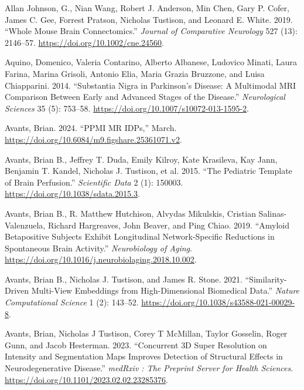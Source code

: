 \documentclass[
  table]{article}
\newlength{\cslhangindent}
\newenvironment{CSLReferences}[2] %
 {\begin{list}{}{%
  \setlength{\itemindent}{0pt}
  \setlength{\leftmargin}{0pt}
  \setlength{\parsep}{0pt}
  \ifodd #1
   \setlength{\leftmargin}{\cslhangindent}
   \setlength{\itemindent}{-1\cslhangindent}
  \fi
  \setlength{\itemsep}{#2\baselineskip}}}
 {\end{list}}
\begin{document}
\label{refs}
\begin{CSLReferences}{1}{0}
Allan Johnson, G., Nian Wang, Robert J. Anderson, Min Chen, Gary P.
Cofer, James C. Gee, Forrest Pratson, Nicholas Tustison, and Leonard E.
White. 2019. {``Whole Mouse Brain Connectomics.''} \emph{Journal of
Comparative Neurology} 527 (13): 2146--57.
\url{https://doi.org/10.1002/cne.24560}.

Aquino, Domenico, Valeria Contarino, Alberto Albanese, Ludovico Minati,
Laura Farina, Marina Grisoli, Antonio Elia, Maria Grazia Bruzzone, and
Luisa Chiapparini. 2014. {``Substantia Nigra in {Parkinson}{'}s Disease:
A Multimodal {MRI} Comparison Between Early and Advanced Stages of the
Disease.''} \emph{Neurological Sciences} 35 (5): 753--58.
\url{https://doi.org/10.1007/s10072-013-1595-2}.

Avants, Brian. 2024. {``{PPMI} {MR} {IDPs},''} March.
\url{https://doi.org/10.6084/m9.figshare.25361071.v2}.

Avants, Brian B., Jeffrey T. Duda, Emily Kilroy, Kate Krasileva, Kay
Jann, Benjamin T. Kandel, Nicholas J. Tustison, et al. 2015. {``The
Pediatric Template of Brain Perfusion.''} \emph{Scientific Data} 2 (1):
150003. \url{https://doi.org/10.1038/sdata.2015.3}.

Avants, Brian B., R. Matthew Hutchison, Alvydas Mikulskis, Cristian
Salinas-Valenzuela, Richard Hargreaves, John Beaver, and Ping Chiao.
2019. {``Amyloid Beta{\textendash}positive Subjects Exhibit Longitudinal
Network-Specific Reductions in Spontaneous Brain Activity.''}
\emph{Neurobiology of Aging}.
\url{https://doi.org/10.1016/j.neurobiolaging.2018.10.002}.

Avants, Brian B., Nicholas J. Tustison, and James R. Stone. 2021.
{``Similarity-Driven Multi-View Embeddings from High-Dimensional
Biomedical Data.''} \emph{Nature Computational Science} 1 (2): 143--52.
\url{https://doi.org/10.1038/s43588-021-00029-8}.

Avants, Brian, Nicholas J Tustison, Corey T McMillan, Taylor Gosselin,
Roger Gunn, and Jacob Hesterman. 2023. {``Concurrent {3D} Super
Resolution on Intensity and Segmentation Maps Improves Detection of
Structural Effects in Neurodegenerative Disease.''} \emph{medRxiv : The
Preprint Server for Health Sciences}.
\url{https://doi.org/10.1101/2023.02.02.23285376}.


\end{CSLReferences}
\end{document}
